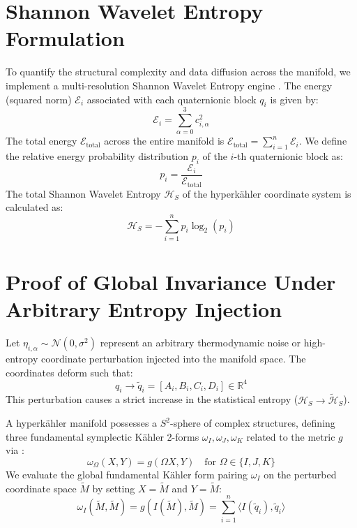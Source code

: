 \documentclass[11pt,preview,cite,epsf,twoside,amsfonts]{amsart}
\begin{document}
\section{Shannon Wavelet Entropy Formulation}
To quantify the structural complexity and data diffusion across the manifold, we implement a multi-resolution Shannon Wavelet Entropy engine \cite{rosso2001wavelet, blaco2006mechanisms}. The energy (squared norm) $\mathcal{E}_i$ associated with each quaternionic block $q_i$ is given by:
\begin{equation}
\mathcal{E}_i = \sum_{\alpha=0}^{3} c_{i,\alpha}^2
\end{equation}
The total energy $\mathcal{E}_{\text{total}}$ across the entire manifold is $\mathcal{E}_{\text{total}} = \sum_{i=1}^{n} \mathcal{E}_i$. We define the relative energy probability distribution $p_i$ of the $i$-th quaternionic block as:
\begin{equation}
p_i = \frac{\mathcal{E}_i}{\mathcal{E}_{\text{total}}}
\end{equation}
The total Shannon Wavelet Entropy $\mathcal{H}_S$ of the hyperk\"{a}hler coordinate system is calculated as:
\begin{equation}
\mathcal{H}_S = -\sum_{i=1}^{n} p_i \log_2(p_i)
\end{equation}

\section{Proof of Global Invariance Under Arbitrary Entropy Injection}
Let $\eta_{i,\alpha} \sim \mathcal{N}(0, \sigma^2)$ represent an arbitrary thermodynamic noise or high-entropy coordinate perturbation injected into the manifold space. The coordinates deform such that:
\begin{equation}
q_i \to \tilde{q}_i = [A_i, B_i, C_i, D_i] \in \mathbb{R}^4
\end{equation}
This perturbation causes a strict increase in the statistical entropy ($\mathcal{H}_S \to \tilde{\mathcal{H}}_S$). 

A hyperk\"{a}hler manifold possesses a $S^2$-sphere of complex structures, defining three fundamental symplectic K\"{a}hler 2-forms $\omega_I, \omega_J, \omega_K$ related to the metric $g$ via \cite{hitchin1987hyperkahler}:
\begin{equation}
\omega_\Omega(X, Y) = g(\Omega X, Y) \quad \text{for } \Omega \in \{I, J, K\}
\end{equation}
We evaluate the global fundamental K\"{a}hler form pairing $\omega_I$ on the perturbed coordinate space $\tilde{M}$ by setting $X = \tilde{M}$ and $Y = \tilde{M}$:
\begin{equation}
\omega_I(\tilde{M}, \tilde{M}) = g(I(\tilde{M}), \tilde{M}) = \sum_{i=1}^{n} \langle I(\tilde{q}_i), \tilde{q}_i \rangle
\end{equation}
\end{document}
